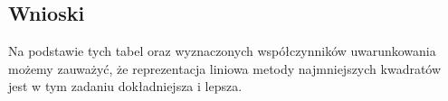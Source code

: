 \documentclass{article}
\begin{document}
	\subsection*{Wnioski}
	
	Na podstawie tych tabel oraz wyznaczonych współczynników uwarunkowania możemy zauważyć, że reprezentacja liniowa metody najmniejszych kwadratów jest w tym zadaniu dokładniejsza i lepsza.
	
	
	
	
	
	
	
	
	
	
	
	
	
	
	
	
	
	
	
	
	
	
	
	
	
	
	
	
	
	
	
	
\end{document}
